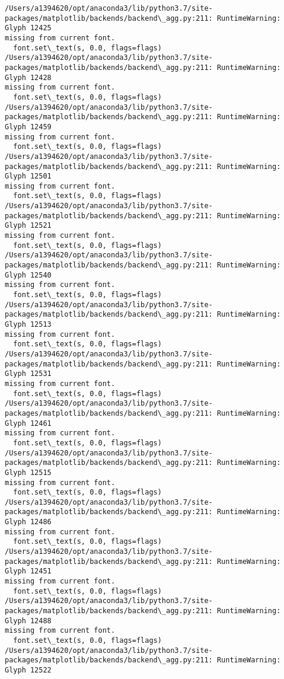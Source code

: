 \documentclass[11pt]{article}
\begin{document}
\begin{Verbatim}[commandchars=\\\{\}]
/Users/a1394620/opt/anaconda3/lib/python3.7/site-
packages/matplotlib/backends/backend\_agg.py:211: RuntimeWarning: Glyph 12425
missing from current font.
  font.set\_text(s, 0.0, flags=flags)
/Users/a1394620/opt/anaconda3/lib/python3.7/site-
packages/matplotlib/backends/backend\_agg.py:211: RuntimeWarning: Glyph 12428
missing from current font.
  font.set\_text(s, 0.0, flags=flags)
/Users/a1394620/opt/anaconda3/lib/python3.7/site-
packages/matplotlib/backends/backend\_agg.py:211: RuntimeWarning: Glyph 12459
missing from current font.
  font.set\_text(s, 0.0, flags=flags)
/Users/a1394620/opt/anaconda3/lib/python3.7/site-
packages/matplotlib/backends/backend\_agg.py:211: RuntimeWarning: Glyph 12501
missing from current font.
  font.set\_text(s, 0.0, flags=flags)
/Users/a1394620/opt/anaconda3/lib/python3.7/site-
packages/matplotlib/backends/backend\_agg.py:211: RuntimeWarning: Glyph 12521
missing from current font.
  font.set\_text(s, 0.0, flags=flags)
/Users/a1394620/opt/anaconda3/lib/python3.7/site-
packages/matplotlib/backends/backend\_agg.py:211: RuntimeWarning: Glyph 12540
missing from current font.
  font.set\_text(s, 0.0, flags=flags)
/Users/a1394620/opt/anaconda3/lib/python3.7/site-
packages/matplotlib/backends/backend\_agg.py:211: RuntimeWarning: Glyph 12513
missing from current font.
  font.set\_text(s, 0.0, flags=flags)
/Users/a1394620/opt/anaconda3/lib/python3.7/site-
packages/matplotlib/backends/backend\_agg.py:211: RuntimeWarning: Glyph 12531
missing from current font.
  font.set\_text(s, 0.0, flags=flags)
/Users/a1394620/opt/anaconda3/lib/python3.7/site-
packages/matplotlib/backends/backend\_agg.py:211: RuntimeWarning: Glyph 12461
missing from current font.
  font.set\_text(s, 0.0, flags=flags)
/Users/a1394620/opt/anaconda3/lib/python3.7/site-
packages/matplotlib/backends/backend\_agg.py:211: RuntimeWarning: Glyph 12515
missing from current font.
  font.set\_text(s, 0.0, flags=flags)
/Users/a1394620/opt/anaconda3/lib/python3.7/site-
packages/matplotlib/backends/backend\_agg.py:211: RuntimeWarning: Glyph 12486
missing from current font.
  font.set\_text(s, 0.0, flags=flags)
/Users/a1394620/opt/anaconda3/lib/python3.7/site-
packages/matplotlib/backends/backend\_agg.py:211: RuntimeWarning: Glyph 12451
missing from current font.
  font.set\_text(s, 0.0, flags=flags)
/Users/a1394620/opt/anaconda3/lib/python3.7/site-
packages/matplotlib/backends/backend\_agg.py:211: RuntimeWarning: Glyph 12488
missing from current font.
  font.set\_text(s, 0.0, flags=flags)
/Users/a1394620/opt/anaconda3/lib/python3.7/site-
packages/matplotlib/backends/backend\_agg.py:211: RuntimeWarning: Glyph 12522

\end{Verbatim}
\end{document}
